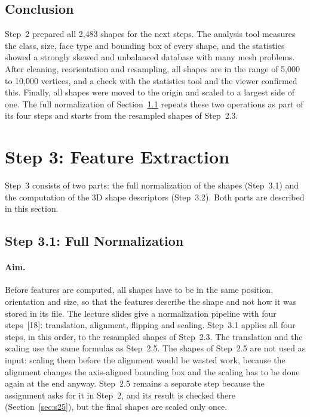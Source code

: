 \documentclass[10pt,a4paper]{article}
\begin{document}
\subsection{Conclusion}
Step~2 prepared all 2,483 shapes for the next steps. The analysis tool measures the class, size, face type and bounding box of
every shape, and the statistics showed a strongly skewed and unbalanced database with many mesh problems. After cleaning,
reorientation and resampling, all shapes are in the range of 5,000 to 10,000 vertices, and a check with the statistics tool and
the viewer confirmed this. Finally, all shapes were moved to the origin and scaled to a largest side of one. The full
normalization of Section~\ref{sec:normalization} repeats these two operations as part of its four steps and starts from the
resampled shapes of Step~2.3.

\section{Step 3: Feature Extraction}\label{sec:step3}

Step~3 consists of two parts: the full normalization of the shapes (Step~3.1) and the computation of the 3D shape descriptors
(Step~3.2). Both parts are described in this section.

\subsection{Step 3.1: Full Normalization}\label{sec:normalization}

\paragraph{Aim.}
Before features are computed, all shapes have to be in the same position, orientation and size, so that the features describe
the shape and not how it was stored in its file. The lecture slides give a normalization pipeline with four steps~[18]:
translation, alignment, flipping and scaling. Step~3.1 applies all four steps, in this order, to the resampled shapes of
Step~2.3. The translation and the scaling use the same formulas as Step~2.5. The shapes of Step~2.5 are not used as input:
scaling them before the alignment would be wasted work, because the alignment changes the axis-aligned bounding box and the
scaling has to be done again at the end anyway. Step~2.5 remains a separate step because the assignment asks for it in Step~2,
and its result is checked there (Section~\ref{sec:s25}), but the final shapes are scaled only once.
\end{document}
